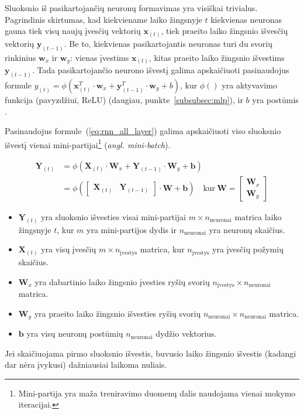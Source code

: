 \documentclass{VUMIFPSbakalaurinis}
\begin{document}
{	Sluoksnio iš pasikartojančių neuronų formavimas yra visiškai trivialus. Pagrindinis skirtumas, kad kiekviename laiko žingsnyje \(t\) kiekvienas neuronas gauna tiek visų naujų įvesčių vektorių \(\mathbf{x}_{(t)}\), tiek praeito laiko žingsnio išvesčių vektorių \(\mathbf{y}_{(t-1)}\). Be to, kiekvienas pasikartojantis neuronas turi du svorių rinkinius \(\mathbf{w}_x\) ir \(\mathbf{w}_y\): vienas įvestims \(\mathbf{x}_{(t)}\), kitas praeito laiko žingsnio išvestims \(\mathbf{y}_{(t-1)}\). Tada pasikartojančio neurono išvestį galima apskaičiuoti pasinaudojus formule \(y_{(t)} = \phi (\mathbf{x}_{(t)}^T \cdot \mathbf{w}_x + \mathbf{y}_{(t-1)}^T \cdot \mathbf{w}_y + b)\), kur \(\phi()\) yra aktyvavimo funkcija (pavyzdžiui, ReLU) (daugiau, punkte~\ref{subsubsec:mlp}), ir \(b\) yra postūmis \cite{handson}.\par
	
	Pasinaudojus formule~(\ref{eq:rnn_all_layer}) galima apskaičiuoti viso sluoksnio išvestį vienai mini-partijai\footnote{Mini-partija yra maža treniravimo duomenų dalis naudojama vienai mokymo iteracijai.} (\textit{angl. mini-batch}).
	
	\begin{equation}\label{eq:rnn_all_layer}
	\begin{split}
		\mathbf{Y}_{(t)} &= \phi (\mathbf{X}_{(t)} \cdot \mathbf{W}_x + \mathbf{Y}_{(t-1)} \cdot \mathbf{W}_y + \mathbf{b}) \\
		&= \phi (
		\begin{bmatrix}
			\mathbf{X}_{(t)} & \mathbf{Y}_{(t-1)}
		\end{bmatrix} 
		\cdot \mathbf{W}  + \mathbf{b}) \quad \textrm{kur} \ \mathbf{W} =
		\begin{bmatrix}
			\mathbf{W}_x \\
			\mathbf{W}_y
		\end{bmatrix}
	\end{split}
	\end{equation}

	\begin{itemize}
		\item \(\mathbf{Y}_{(t)}\) yra sluoksnio išvesties visai mini-partijai \(m \times n_{\textrm{neuronai}}\) matrica laiko žingsnyje \(t\), kur \(m\) yra mini-partijos dydis ir \(n_{\textrm{neuronai}}\) yra neuronų skaičius.
		\item \(\mathbf{X}_{(t)}\) yra visų įvesčių \(m \times n_{\textrm{įvestys}}\) matrica, kur \(n_{\textrm{įvestys}}\) yra įvesčių požymių skaičius.
		\item \(\mathbf{W}_x\) yra dabartinio laiko žingsnio įvesties ryšių svorių \(n_{\textrm{įvestys}} \times n_{\textrm{neuronai}}\) matrica.
		\item \(\mathbf{W}_y\) yra praeito laiko žingsnio išvesties ryšių svorių \(n_{\textrm{neuronai}} \times n_{\textrm{neuronai}}\) matrica.
		\item \(\mathbf{b}\) yra visų neuronų postūmių \(n_{\textrm{neuronai}}\) dydžio vektorius.
	\end{itemize}\par
	Jei skaičiuojama pirmo sluoksnio išvestis, buvusio laiko žingsnio išvestis (kadangi dar nėra įvykusi) dažniausiai laikoma nuliais.\par
	
}
\end{document}
